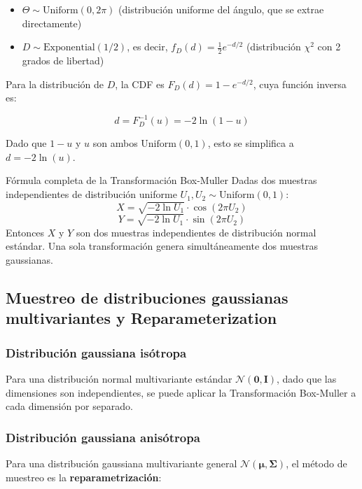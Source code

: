 \documentclass[a4paper]{article}
\begin{document}
\begin{itemize}
    \item $\Theta \sim \text{Uniform}(0, 2\pi)$ (distribución uniforme del ángulo, que se extrae directamente)
    \item $D \sim \text{Exponential}(1/2)$, es decir, $f_D(d) = \frac{1}{2}e^{-d/2}$ (distribución $\chi^2$ con 2 grados de libertad)
\end{itemize}

Para la distribución de $D$, la CDF es $F_D(d) = 1 - e^{-d/2}$, cuya función inversa es:

$$d = F_D^{-1}(u) = -2\ln(1 - u)$$

Dado que $1-u$ y $u$ son ambos $\text{Uniform}(0,1)$, esto se simplifica a $d = -2\ln(u)$.

\begin{importantbox}{Fórmula completa de la Transformación Box-Muller}
Dadas dos muestras independientes de distribución uniforme $U_1, U_2 \sim \text{Uniform}(0,1)$:
$$X = \sqrt{-2\ln U_1} \cdot \cos(2\pi U_2)$$
$$Y = \sqrt{-2\ln U_1} \cdot \sin(2\pi U_2)$$
Entonces $X$ y $Y$ son dos muestras independientes de distribución normal estándar. Una sola transformación genera simultáneamente dos muestras gaussianas.
\end{importantbox}

\subsection{Muestreo de distribuciones gaussianas multivariantes y Reparameterization}

\subsubsection{Distribución gaussiana isótropa}

Para una distribución normal multivariante estándar $\mathcal{N}(\mathbf{0}, \mathbf{I})$, dado que las dimensiones son independientes, se puede aplicar la Transformación Box-Muller a cada dimensión por separado.

\subsubsection{Distribución gaussiana anisótropa}

Para una distribución gaussiana multivariante general $\mathcal{N}(\boldsymbol{\mu}, \boldsymbol{\Sigma})$, el método de muestreo es la \textbf{reparametrización}:
\end{document}
